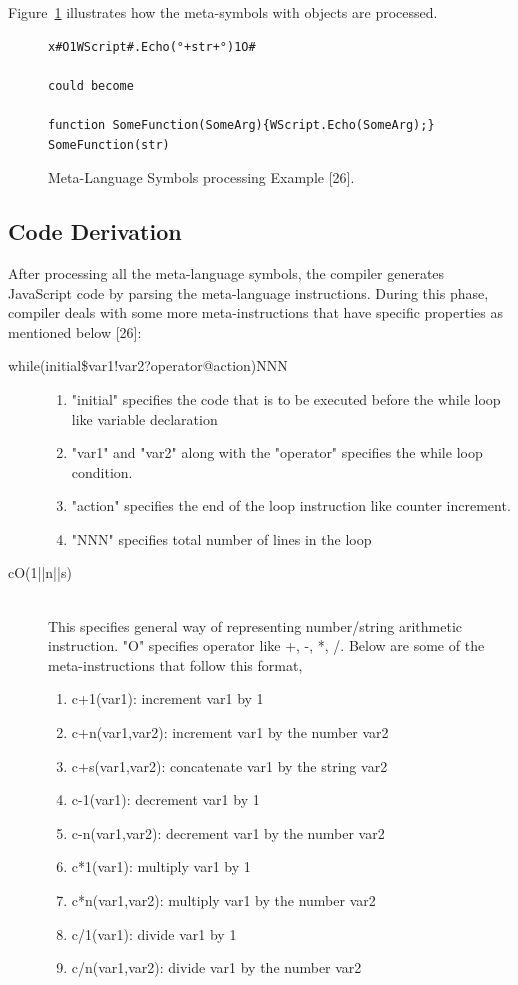 Figure~\ref{fig:metalanguageprocessing} illustrates how the meta-symbols with objects are processed.

\begin{figure}
  \centering
  \begin{lstlisting}[language=myasm,numbers=none]
x#O1WScript#.Echo(°+str+°)1O# 

could become

function SomeFunction(SomeArg){WScript.Echo(SomeArg);}
SomeFunction(str)
\end{lstlisting}
    \caption[Meta-Language Symbols processing Example]{Meta-Language Symbols processing Example [26].}
    \label{fig:metalanguageprocessing}
\end{figure}

\subsection{Code Derivation}
After processing all the meta-language symbols, the compiler generates JavaScript code by parsing the meta-language instructions. During this phase, compiler deals with some more meta-instructions that have specific properties as mentioned below [26]:
\begin{description}
\item[while(initial\$var1!var2?operator@action)NNN]\hfill 
\begin{enumerate}
\item "initial" specifies the code that is to be executed before the while loop like variable declaration
\item "var1" and "var2" along with the "operator" specifies the while loop condition.
\item "action" specifies the end of the loop instruction like counter increment.
\item "NNN" specifies total number of lines in the loop
\end{enumerate}

\item[cO(1||n||s)] \hfill \\
This specifies general way of representing number/string arithmetic instruction. "O" specifies operator like +, -, *, /. Below are some of the meta-instructions that follow this format,
\begin{enumerate}
\item c+1(var1): increment var1 by 1
\item c+n(var1,var2): increment var1 by the number var2
\item c+s(var1,var2): concatenate var1 by the string var2
\item c-1(var1): decrement var1 by 1
\item c-n(var1,var2): decrement var1 by the number var2
\item c*1(var1): multiply var1 by 1
\item c*n(var1,var2): multiply var1 by the number var2
\item c/1(var1): divide var1 by 1
\item c/n(var1,var2): divide var1 by the number var2 
  \end{enumerate}
\end{description}

